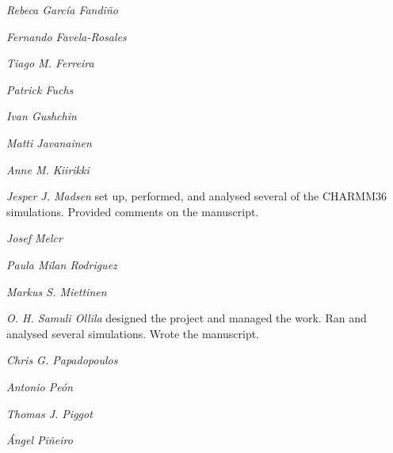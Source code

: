\documentclass[journal=jpcbfk]{achemso}
\begin{document}
\noindent
{\it Rebeca Garc{\'i}a Fandi{\~n}o}

\noindent
{\it Fernando Favela-Rosales}

\noindent
{\it Tiago M. Ferreira}

\noindent
{\it Patrick Fuchs}

\noindent
{\it Ivan Gushchin}

\noindent
{\it Matti Javanainen}

\noindent
{\it Anne M. Kiirikki}

\noindent
{\it Jesper J. Madsen}
set up, performed, and analysed several of the CHARMM36 simulations.
Provided comments on the manuscript.

\noindent
{\it Josef Melcr}

\noindent
{\it Paula Milan Rodriguez}

\noindent
{\it Markus S. Miettinen}

\noindent
{\it O. H. Samuli Ollila}
designed the project and managed the work.
Ran and analysed several simulations. Wrote the manuscript.

\noindent
{\it Chris G. Papadopoulos}

\noindent
{\it Antonio Pe{\'o}n}

\noindent
{\it Thomas J. Piggot}

\noindent
{\it {\'A}ngel Pi{\~n}eiro}


\end{document}

